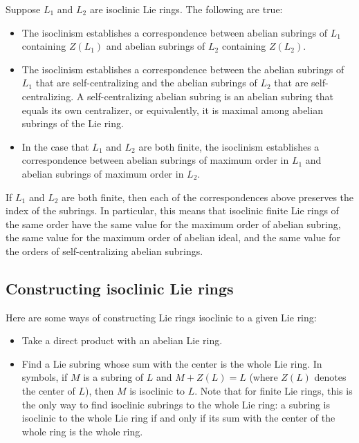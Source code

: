 \documentclass{ucetd}
\begin{document}
Suppose $L_1$ and $L_2$ are isoclinic Lie rings. The following are true:

\begin{itemize}
\item The isoclinism establishes a correspondence between abelian
  subrings of $L_1$ containing $Z(L_1)$ and abelian subrings of
  $L_2$ containing $Z(L_2)$.
\item The isoclinism establishes a correspondence between the abelian
  subrings of $L_1$ that are self-centralizing and the abelian
  subrings of $L_2$ that are self-centralizing. A self-centralizing
  abelian subring is an abelian subring that equals its own
  centralizer, or equivalently, it is maximal among abelian subrings
  of the Lie ring.
\item In the case that $L_1$ and $L_2$ are both finite, the isoclinism
  establishes a correspondence between abelian subrings of maximum
  order in $L_1$ and abelian subrings of maximum order in
  $L_2$.
\end{itemize}

If $L_1$ and $L_2$ are both finite, then each of the correspondences
above preserves the index of the subrings. In particular, this means
that isoclinic finite Lie rings of the same order have the same value
for the maximum order of abelian subring, the same value for the
maximum order of abelian ideal, and the same value for the orders of
self-centralizing abelian subrings.

\subsection{Constructing isoclinic Lie rings}

Here are some ways of constructing Lie rings isoclinic to a given Lie ring:

\begin{itemize}
\item Take a direct product with an abelian Lie ring.
\item Find a Lie subring whose sum with the center is the whole Lie
  ring. In symbols, if $M$ is a subring of $L$ and $M + Z(L) = L$
  (where $Z(L)$ denotes the center of $L$), then $M$ is isoclinic to
  $L$. Note that for finite Lie rings, this is the only way to find
  isoclinic subrings to the whole Lie ring: a subring is isoclinic to
  the whole Lie ring if and only if its sum with the center of the
  whole ring is the whole ring.
\end{itemize}
\end{document}
